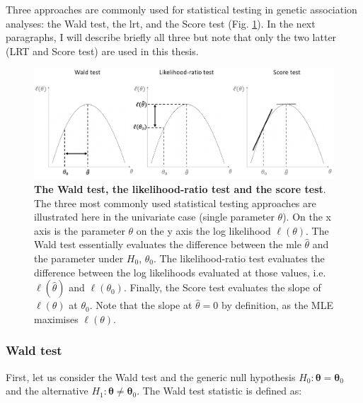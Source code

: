 
\vspace{5mm}

Three approaches are commonly used for statistical testing in genetic association analyses: the Wald test, the \gls{lrt}, and the Score test (Fig. \ref{fig:hypothesis_tests}).
In the next paragraphs, I will describe briefly all three but note that only the two latter (LRT and Score test) are used in this thesis.

\begin{figure}[h]
\centering
\includegraphics[width=15cm]{Chapter2/Fig/wald_lrt_score_tests.png}
\caption[\textbf{Wald, LRT and score test}]{\textbf{The Wald test, the likelihood-ratio test and the score test}.\\
The three most commonly used statistical testing approaches are illustrated here in the univariate case (single parameter $\theta$). 
On the x axis is the parameter $\theta$ on the y axis the log likelihood $\ell(\theta)$.
The Wald test essentially evaluates the difference between the \gls{mle} $\hat{\theta}$ and the parameter under $H_0$, $\theta_0$.
The likelihood-ratio test evaluates the difference between the log likelihoods evaluated at those values, i.e. $\ell(\hat{\theta})$ and $\ell(\theta_0)$.
Finally, the Score test evaluates the slope of $\ell(\theta)$ at $\theta_0$. Note that the slope at $\hat{\theta}=0$ by definition, as the MLE maximises $\ell(\theta)$.}
\label{fig:hypothesis_tests}
\end{figure}

\subsubsection{Wald test}

First, let us consider the Wald test and the generic null hypothesis $H_0: \boldsymbol{\theta} = \boldsymbol{\theta}_0$ and the alternative $H_1: \boldsymbol{\theta} \neq \boldsymbol{\theta}_0$.
The Wald test statistic is defined as:


